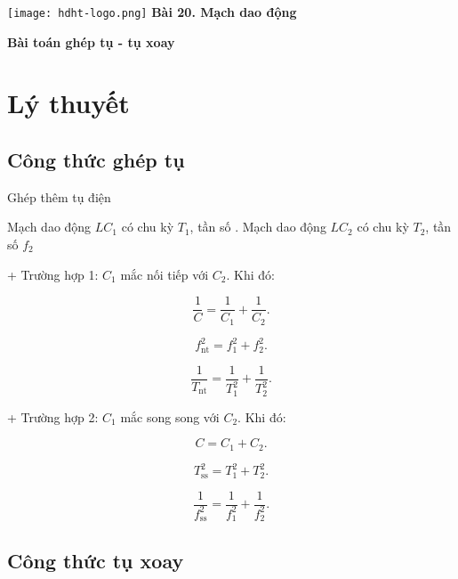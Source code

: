 \newcommand{\chapter}[2][]{
	\newcommand{\chapname}{#2}
	\begin{flushleft}
		\begin{minipage}[t]{\linewidth}
			\texttt{[image: hdht-logo.png]}
			\hspace{0pt}	
			\sffamily\bfseries\large Bài  20. Mạch dao động
			\begin{flushleft}
				\huge\bfseries #1
			\end{flushleft}
		\end{minipage}
	\end{flushleft}
	\vspace{1cm}
	\normalfont\normalsize
}
\chapter[Bài toán ghép tụ - tụ xoay]{Bài toán ghép tụ - tụ xoay}
\section{Lý thuyết}

\subsection{Công thức ghép tụ}

Ghép thêm tụ điện

Mạch dao động $LC_1$ có chu kỳ $T_1$, tần số . Mạch dao động $LC_2$ có chu kỳ $T_2$, tần số $f_2$

+ Trường hợp 1: $C_1$ mắc nối tiếp với $C_2$. Khi đó:

$$\dfrac{1}{C}= \dfrac{1}{C_1}+ \dfrac{1}{C_2}.$$

$$f_\text{nt}^2=f_1^2+f_2^2.$$

$$\dfrac{1}{T_\text{nt}}= \dfrac{1}{T^2_1}+ \dfrac{1}{T^2_2}.$$

+ Trường hợp 2: $C_1$ mắc song song với $C_2$. Khi đó:


$$C= C_1 + C_2.$$

$$T_\text{ss}^2=T_1^2+T_2^2.$$

$$\dfrac{1}{f_\text{ss}^2}= \dfrac{1}{f^2_1}+ \dfrac{1}{f^2_2}.$$





\subsection{Công thức tụ xoay}

